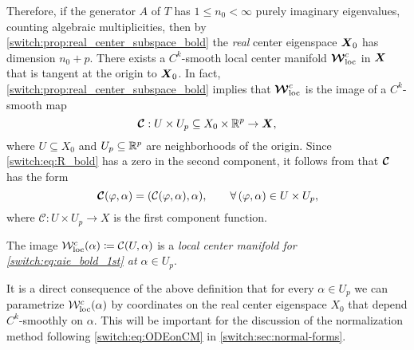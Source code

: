 Therefore, if the generator $A$ of $T$ has $1 \le n_0 < \infty$ purely imaginary eigenvalues, counting algebraic multiplicities, then by \cref{switch:prop:real_center_subspace_bold} the \emph{real} center eigenspace $\boldsymbol{X}_0$ has dimension $n_0 + p$. There exists a $C^k$-smooth local center manifold $\boldsymbol{\mathcal{W}}^c_{\text{loc}}$ in $\boldsymbol{X}$ that is tangent at the origin to $\boldsymbol{X}_0$. In fact, \cref{switch:prop:real_center_subspace_bold} implies that $\boldsymbol{\mathcal{W}}^c_{\text{loc}}$ is the image of a $C^k$-smooth map
\[
  \boldsymbol{\mathcal{C}} : U \times U_p \subseteq X_0 \times \mathbb{R}^p \to \boldsymbol{X},
\]
where $U \subseteq X_0$ and $U_p \subseteq \mathbb{R}^p$ are neighborhoods of the origin. Since \cref{switch:eq:R_bold} has a zero in the second component, it follows from \cite[(5.1) in Section IX.5]{diekmann1995delay} that $\boldsymbol{\mathcal{C}}$ has the form
\begin{equation}
  \label{switch:eq:cmmap_bold}
\boldsymbol{\mathcal{C}}(\varphi, \alpha) = (\mathcal{C}(\varphi, \alpha), \alpha), \qquad \forall\,(\varphi, \alpha) \in U \times U_p,
\end{equation}
where $\mathcal{C} : U \times U_p \to X$ is the first component function.

\begin{definition}\label{switch:def:cm_alpha}
  The image $\mathcal{W}^c_{\text{loc}}(\alpha) \coloneqq \mathcal{C}(U, \alpha)$ is a \emph{local center manifold for \cref{switch:eq:aie_bold_1st} at $\alpha \in U_p$}.
\end{definition}

It is a direct consequence of the above definition that for every $\alpha \in U_p$ we can parametrize $\mathcal{W}^c_{\text{loc}}(\alpha)$ by coordinates on the real center eigenspace $X_0$ that depend $C^k$-smoothly on $\alpha$. This will be important for the discussion of the normalization method following \cref{switch:eq:ODEonCM} in \cref{switch:sec:normal-forms}.

